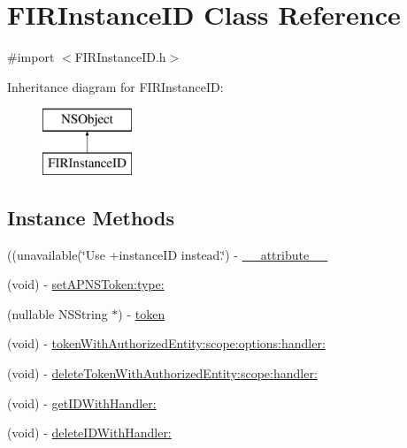 \hypertarget{interface_f_i_r_instance_i_d}{}\section{F\+I\+R\+Instance\+I\+D Class Reference}
\label{interface_f_i_r_instance_i_d}


{\ttfamily \#import $<$F\+I\+R\+Instance\+I\+D.\+h$>$}

Inheritance diagram for F\+I\+R\+Instance\+I\+D\+:\begin{figure}[H]
\begin{center}
\leavevmode
\includegraphics[height=2.000000cm]{interface_f_i_r_instance_i_d}
\end{center}
\end{figure}
\subsection*{Instance Methods}
\begin{DoxyCompactItemize}
\item 
((unavailable(\char`\"{}Use +instance\+I\+D instead.\char`\"{}) -\/ \hyperlink{interface_f_i_r_instance_i_d_af279c596c921d128d0e93ee83f1391f1}{\+\_\+\+\_\+attribute\+\_\+\+\_\+}
\item 
(void) -\/ \hyperlink{interface_f_i_r_instance_i_d_a7cd9dde64e899e05a27397d3ee3fb398}{set\+A\+P\+N\+S\+Token\+:type\+:}
\item 
(nullable N\+S\+String $\ast$) -\/ \hyperlink{interface_f_i_r_instance_i_d_a24c0ad9b49c659939163ebdcadabb91b}{token}
\item 
(void) -\/ \hyperlink{interface_f_i_r_instance_i_d_a7a80d4f005651f1ee55c99ccbb46d937}{token\+With\+Authorized\+Entity\+:scope\+:options\+:handler\+:}
\item 
(void) -\/ \hyperlink{interface_f_i_r_instance_i_d_ac6591ae2dbe461f7b4a1b5556929e271}{delete\+Token\+With\+Authorized\+Entity\+:scope\+:handler\+:}
\item 
(void) -\/ \hyperlink{interface_f_i_r_instance_i_d_a1b25f9da3a7d07337ea21fe67cfd20de}{get\+I\+D\+With\+Handler\+:}
\item 
(void) -\/ \hyperlink{interface_f_i_r_instance_i_d_a51b2466dd3f41ad16756cdfb592391cc}{delete\+I\+D\+With\+Handler\+:}
\end{DoxyCompactItemize}
